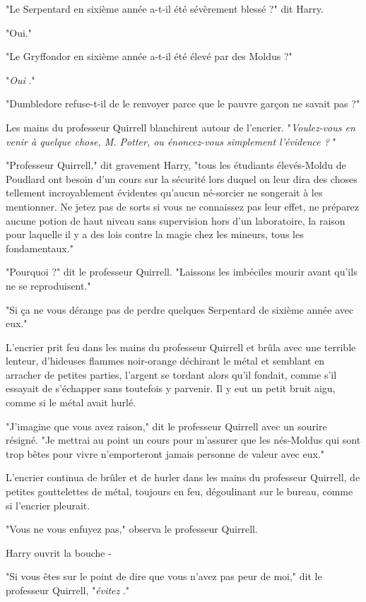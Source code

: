 "Le Serpentard en sixième année a-t-il été sévèrement blessé ?" dit Harry.

"Oui."

"Le Gryffondor en sixième année a-t-il été élevé par des Moldus ?"

"\emph{Oui} ."

"Dumbledore refuse-t-il de le renvoyer parce que le pauvre garçon ne savait pas ?"

Les mains du professeur Quirrell blanchirent autour de l'encrier. "\emph{Voulez-vous en venir à quelque chose, M. Potter, ou énoncez-vous simplement l'évidence ?} "

"Professeur Quirrell," dit gravement Harry, "tous les étudiants élevés-Moldu de Poudlard ont besoin d'un cours sur la sécurité lors duquel on leur dira des choses tellement incroyablement évidentes qu'aucun né-sorcier ne songerait à les mentionner. Ne jetez pas de sorts si vous ne connaissez pas leur effet, ne préparez aucune potion de haut niveau sans supervision hors d'un laboratoire, la raison pour laquelle il y a des lois contre la magie chez les mineurs, tous les fondamentaux."

"Pourquoi ?" dit le professeur Quirrell. "Laissons les imbéciles mourir avant qu'ils ne se reproduisent."

"Si ça ne vous dérange pas de perdre quelques Serpentard de sixième année avec eux."

L'encrier prit feu dans les mains du professeur Quirrell et brûla avec une terrible lenteur, d'hideuses flammes noir-orange déchirant le métal et semblant en arracher de petites parties, l'argent se tordant alors qu'il fondait, comme s'il essayait de s'échapper sans toutefois y parvenir. Il y eut un petit bruit aigu, comme si le métal avait hurlé.

"J'imagine que vous avez raison," dit le professeur Quirrell avec un sourire résigné. "Je mettrai au point un cours pour m'assurer que les nés-Moldus qui sont trop bêtes pour vivre n'emporteront jamais personne de valeur avec eux."

L'encrier continua de brûler et de hurler dans les mains du professeur Quirrell, de petites gouttelettes de métal, toujours en feu, dégoulinant sur le bureau, comme si l'encrier pleurait.

"Vous ne vous enfuyez pas," observa le professeur Quirrell.

Harry ouvrit la bouche -

"Si vous êtes sur le point de dire que vous n'avez pas peur de moi," dit le professeur Quirrell, "\emph{évitez} ."

